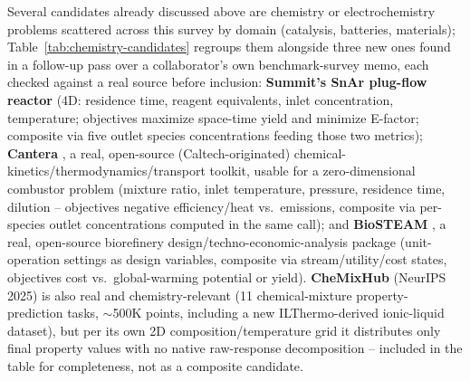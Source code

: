 \documentclass[11pt]{article}
\begin{document}
Several candidates already discussed above are chemistry or
electrochemistry problems scattered across this survey by domain
(catalysis, batteries, materials); Table~\ref{tab:chemistry-candidates}
regroups them alongside three new ones found in a follow-up pass over a
collaborator's own benchmark-survey memo, each checked against a real
source before inclusion: \textbf{Summit's SnAr plug-flow reactor}
\citep{felton2021summit} (4D: residence time, reagent equivalents, inlet
concentration, temperature; objectives maximize space-time yield and
minimize E-factor; composite via five outlet species concentrations
feeding those two metrics); \textbf{Cantera}
\citep{goodwin2024cantera}, a real, open-source (Caltech-originated)
chemical-kinetics/thermodynamics/transport toolkit, usable for a
zero-dimensional combustor problem (mixture ratio, inlet temperature,
pressure, residence time, dilution -- objectives negative
efficiency/heat vs.\ emissions, composite via per-species outlet
concentrations computed in the same call); and \textbf{BioSTEAM}
\citep{cortespena2020biosteam}, a real, open-source biorefinery
design/techno-economic-analysis package (unit-operation settings as
design variables, composite via stream/utility/cost states, objectives
cost vs.\ global-warming potential or yield). \textbf{CheMixHub}
\citep{rajaonson2025chemixhub} (NeurIPS 2025) is also real and chemistry-relevant
(11 chemical-mixture property-prediction tasks, $\sim$500K points,
including a new ILThermo-derived ionic-liquid dataset), but per its own
2D composition/temperature grid it distributes only final property
values with no native raw-response decomposition -- included in the
table for completeness, not as a composite candidate.
\end{document}

